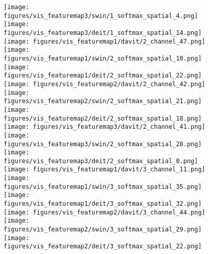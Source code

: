 \documentclass[runningheads]{llncs}
\begin{document}
\begin{figure}[t]
\texttt{[image: figures/vis\_featuremap3/swin/1\_softmax\_spatial\_4.png]}\hspace{-0.2pt}
\texttt{[image: figures/vis\_featuremap3/deit/1\_softmax\_spatial\_14.png]}
\\
\vspace{0.5mm}
\texttt{[image: figures/vis\_featuremap1/davit/2\_channel\_47.png]}\hspace{-0.2pt}
\texttt{[image: figures/vis\_featuremap1/swin/2\_softmax\_spatial\_10.png]}\hspace{-0.2pt}
\texttt{[image: figures/vis\_featuremap1/deit/2\_softmax\_spatial\_22.png]}\hspace{1.5pt}
\texttt{[image: figures/vis\_featuremap2/davit/2\_channel\_42.png]}\hspace{-0.2pt}
\texttt{[image: figures/vis\_featuremap2/swin/2\_softmax\_spatial\_21.png]}\hspace{-0.2pt}
\texttt{[image: figures/vis\_featuremap2/deit/2\_softmax\_spatial\_18.png]}\hspace{1.5pt}
\texttt{[image: figures/vis\_featuremap3/davit/2\_channel\_41.png]}\hspace{-0.2pt}
\texttt{[image: figures/vis\_featuremap3/swin/2\_softmax\_spatial\_28.png]}\hspace{-0.2pt}
\texttt{[image: figures/vis\_featuremap3/deit/2\_softmax\_spatial\_0.png]}
\\
\vspace{0.5mm}
\texttt{[image: figures/vis\_featuremap1/davit/3\_channel\_11.png]}\hspace{-0.2pt}
\texttt{[image: figures/vis\_featuremap1/swin/3\_softmax\_spatial\_35.png]}\hspace{-0.2pt}
\texttt{[image: figures/vis\_featuremap1/deit/3\_softmax\_spatial\_32.png]}\hspace{1.5pt}
\texttt{[image: figures/vis\_featuremap2/davit/3\_channel\_44.png]}\hspace{-0.2pt}
\texttt{[image: figures/vis\_featuremap2/swin/3\_softmax\_spatial\_29.png]}\hspace{-0.2pt}
\texttt{[image: figures/vis\_featuremap2/deit/3\_softmax\_spatial\_22.png]}\hspace{1.5pt}

\end{figure}
\end{document}
